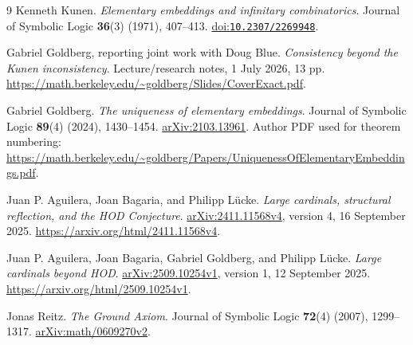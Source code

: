 \documentclass[11pt,letterpaper]{article}
\theoremstyle{definition}
\newcommand{\arxiv}[1]{\href{https://arxiv.org/abs/#1}{arXiv:#1}}
\newcommand{\doi}[1]{\href{https://doi.org/#1}{doi:\nolinkurl{#1}}}
\begin{document}
\clearpage
{}
\begin{thebibliography}{9}
\small
{}
Kenneth Kunen.
\emph{Elementary embeddings and infinitary combinatorics}.
Journal of Symbolic Logic \textbf{36}(3) (1971), 407--413.
\doi{10.2307/2269948}.

Gabriel Goldberg, reporting joint work with Doug Blue.
\emph{Consistency beyond the Kunen inconsistency}.
Lecture/research notes, 1 July 2026, 13 pp.
\url{https://math.berkeley.edu/~goldberg/Slides/CoverExact.pdf}.

Gabriel Goldberg.
\emph{The uniqueness of elementary embeddings}.
Journal of Symbolic Logic \textbf{89}(4) (2024), 1430--1454.
\arxiv{2103.13961}.
Author PDF used for theorem numbering:
\url{https://math.berkeley.edu/~goldberg/Papers/UniquenessOfElementaryEmbeddings.pdf}.

Juan P. Aguilera, Joan Bagaria, and Philipp L\"ucke.
\emph{Large cardinals, structural reflection, and the HOD Conjecture}.
\arxiv{2411.11568v4}, version 4, 16 September 2025.
\url{https://arxiv.org/html/2411.11568v4}.

Juan P. Aguilera, Joan Bagaria, Gabriel Goldberg, and Philipp L\"ucke.
\emph{Large cardinals beyond HOD}.
\arxiv{2509.10254v1}, version 1, 12 September 2025.
\url{https://arxiv.org/html/2509.10254v1}.

Jonas Reitz.
\emph{The Ground Axiom}.
Journal of Symbolic Logic \textbf{72}(4) (2007), 1299--1317.
\arxiv{math/0609270v2}.

\end{thebibliography}
\end{document}
